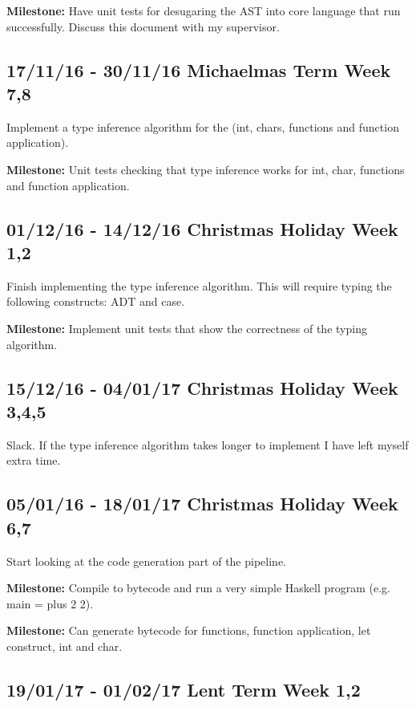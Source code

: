 \documentclass[a4paper]{article}
\begin{document}
      \textbf{Milestone:} Have unit tests for desugaring the AST into core language that run successfully. 
      Discuss this document with my supervisor.


    \subsection*{17/11/16 - 30/11/16 \hfill Michaelmas Term  Week 7,8}

      Implement a type inference algorithm for the (int, chars, functions and function application).

      \textbf{Milestone:} Unit tests checking that type inference works for int, char, functions and function application.

    \subsection*{01/12/16 - 14/12/16 \hfill Christmas Holiday Week 1,2}

    Finish implementing the type inference algorithm. This will require typing the following constructs: ADT and case.
    
    \textbf{Milestone:} Implement unit tests that show the correctness of the typing algorithm. 

    \subsection*{15/12/16 - 04/01/17 \hfill Christmas Holiday Week  3,4,5}

    Slack. If the type inference algorithm takes longer to implement I have left myself extra time.

    \subsection*{05/01/16 - 18/01/17 \hfill Christmas Holiday Week 6,7}

    Start looking at the code generation part of the pipeline.

    \textbf{Milestone:} Compile to bytecode and run a very simple Haskell program (e.g. main = plus 2 2).

    \textbf{Milestone:} Can generate bytecode for functions, function application, let construct, int and char.

    \subsection*{19/01/17 - 01/02/17 \hfill Lent Term Week 1,2}
\end{document}
